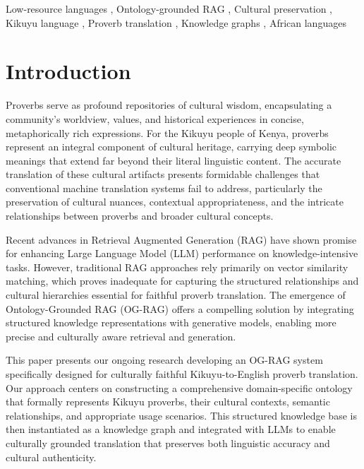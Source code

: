 \documentclass[
]{ceurart}
\begin{document}
\begin{keywords}
  Low-resource languages \sep
  Ontology-grounded RAG \sep
  Cultural preservation \sep
  Kikuyu language \sep
  Proverb translation \sep
  Knowledge graphs \sep
  African languages
\end{keywords}

\maketitle

\section{Introduction}

Proverbs serve as profound repositories of cultural wisdom, encapsulating a community's worldview, values, and historical experiences in concise, metaphorically rich expressions. For the Kikuyu people of Kenya, proverbs represent an integral component of cultural heritage, carrying deep symbolic meanings that extend far beyond their literal linguistic content. The accurate translation of these cultural artifacts presents formidable challenges that conventional machine translation systems fail to address, particularly the preservation of cultural nuances, contextual appropriateness, and the intricate relationships between proverbs and broader cultural concepts.

Recent advances in Retrieval Augmented Generation (RAG) have shown promise for enhancing Large Language Model (LLM) performance on knowledge-intensive tasks. However, traditional RAG approaches rely primarily on vector similarity matching, which proves inadequate for capturing the structured relationships and cultural hierarchies essential for faithful proverb translation. The emergence of Ontology-Grounded RAG (OG-RAG) offers a compelling solution by integrating structured knowledge representations with generative models, enabling more precise and culturally aware retrieval and generation.

This paper presents our ongoing research developing an OG-RAG system specifically designed for culturally faithful Kikuyu-to-English proverb translation. Our approach centers on constructing a comprehensive domain-specific ontology that formally represents Kikuyu proverbs, their cultural contexts, semantic relationships, and appropriate usage scenarios. This structured knowledge base is then instantiated as a knowledge graph and integrated with LLMs to enable culturally grounded translation that preserves both linguistic accuracy and cultural authenticity.
\end{document}
